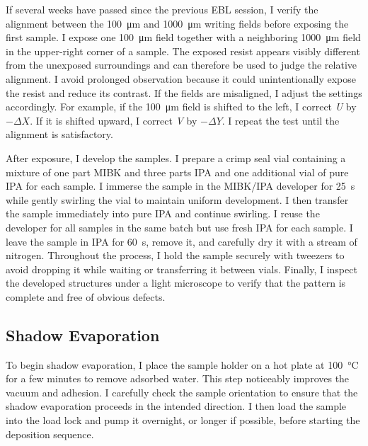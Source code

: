         If several weeks have passed since the previous EBL session, I verify the alignment between the \qty{100}{\micro\meter} and \qty{1000}{\micro\meter} writing fields before exposing the first sample. I expose one \qty{100}{\micro\meter} field together with a neighboring \qty{1000}{\micro\meter} field in the upper-right corner of a sample. The exposed resist appears visibly different from the unexposed surroundings and can therefore be used to judge the relative alignment. I avoid prolonged observation because it could unintentionally expose the resist and reduce its contrast. If the fields are misaligned, I adjust the settings accordingly. For example, if the \qty{100}{\micro\meter} field is shifted to the left, I correct \textit{U} by $-\Delta X$. If it is shifted upward, I correct \textit{V} by $-\Delta Y$. I repeat the test until the alignment is satisfactory.

        After exposure, I develop the samples. I prepare a crimp seal vial containing a mixture of one part MIBK and three parts IPA and one additional vial of pure IPA for each sample. I immerse the sample in the MIBK/IPA developer for \qty{25}{\second} while gently swirling the vial to maintain uniform development. I then transfer the sample immediately into pure IPA and continue swirling. I reuse the developer for all samples in the same batch but use fresh IPA for each sample. I leave the sample in IPA for \qty{60}{\second}, remove it, and carefully dry it with a stream of nitrogen. Throughout the process, I hold the sample securely with tweezers to avoid dropping it while waiting or transferring it between vials. Finally, I inspect the developed structures under a light microscope to verify that the pattern is complete and free of obvious defects.

    \subsection*{Shadow Evaporation}

        To begin shadow evaporation, I place the sample holder on a hot plate at \qty{100}{\degreeCelsius} for a few minutes to remove adsorbed water. This step noticeably improves the vacuum and adhesion. I carefully check the sample orientation to ensure that the shadow evaporation proceeds in the intended direction. I then load the sample into the load lock and pump it overnight, or longer if possible, before starting the deposition sequence.

